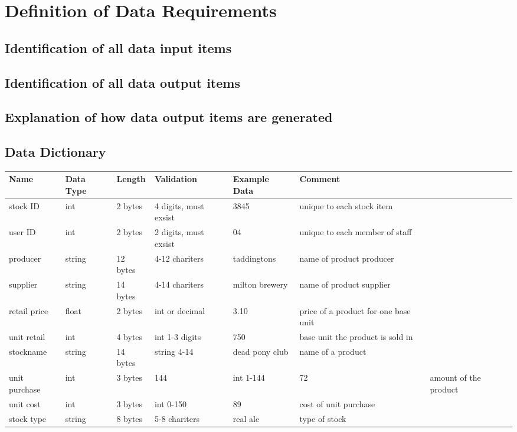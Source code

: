 \section{Definition of Data Requirements}

\subsection{Identification of all data input items}

\subsection{Identification of all data output items}

\subsection{Explanation of how data output items are generated}

\subsection{Data Dictionary}
\begin{center}
\begin{tabular}{|l|l|l|l|l|l|}
    \hline
    \textbf{Name} & \textbf{Data Type} & \textbf{Length} & \textbf{Validation} & \textbf{Example Data} & \textbf{Comment} \\ \hline
	stock ID & int & 2 bytes & 4 digits, must exsist & 3845 & unique to each stock item\\ \hline
	user ID & int & 2 bytes & 2 digits, must exsist & 04 & unique to each member of staff\\ \hline
	producer & string & 12 bytes & 4-12 chariters & taddingtons & name of product producer\\ \hline
	supplier & string & 14 bytes & 4-14 chariters & milton brewery & name of product supplier \\ \hline
	retail price & float & 2 bytes & int or decimal & 3.10 & price of a product for one base unit\\ \hline
	unit retail & int & 4 bytes & int 1-3 digits & 750 & base unit the product is sold in\\ \hline
	stockname & string & 14 bytes & string 4-14 & dead pony club & name of a product\\ \hline
	unit purchase & int & 3 bytes & 144 & int 1-144 & 72 & amount of the product\\ \hline
	unit cost & int & 3 bytes & int 0-150 & 89 & cost of unit purchase\\ \hline
	stock type & string & 8 bytes & 5-8 chariters & real ale & type of stock\\ \hline
	 
\end{tabular}
\label{tab:range_examples}
\end{center}

